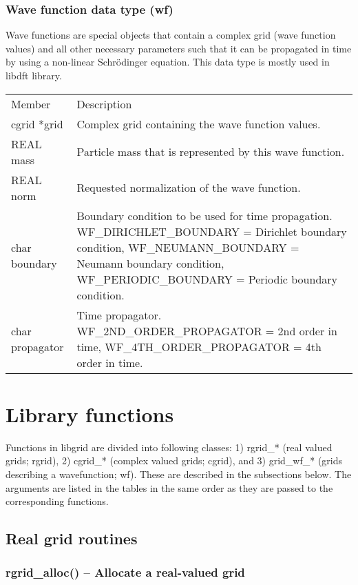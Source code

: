 \documentclass[12pt,letterpaper]{report}
\begin{document}
\subsection{Wave function data type (wf)}

Wave functions are special objects that contain a complex grid (wave function values) and all other necessary parameters such that it can be propagated in time by using a non-linear Schr\"odinger equation. This data type is mostly used in libdft library.

\begin{longtable}{p{} p{}}
Member & Description\\
\cline{1-2}
cgrid *grid & Complex grid containing the wave function values.\\
REAL mass & Particle mass that is represented by this wave function.\\
REAL norm & Requested normalization of the wave function.\\
char boundary & Boundary condition to be used for time propagation. WF\_DIRICHLET\_BOUNDARY = Dirichlet boundary condition, WF\_NEUMANN\_BOUNDARY = Neumann boundary condition, WF\_PERIODIC\_BOUNDARY = Periodic boundary condition.\\
char propagator & Time propagator. WF\_2ND\_ORDER\_PROPAGATOR = 2nd order in time, WF\_4TH\_ORDER\_PROPAGATOR = 4th order in time.\\
\end{longtable}

\chapter{Library functions}

Functions in libgrid are divided into following classes: 1) rgrid\_* (real valued grids; rgrid), 2) cgrid\_* (complex valued grids; cgrid), and 3) grid\_wf\_* (grids describing a wavefunction; wf). These are described in the subsections below. The arguments are listed in the tables in the same order as they are passed to the corresponding functions.

\section{Real grid routines}

\subsection{rgrid\_alloc() -- Allocate a real-valued grid}
\end{document}

